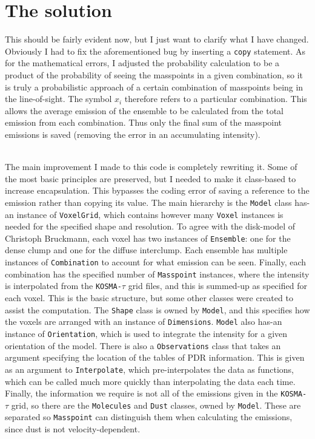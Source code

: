 \documentclass[onecolumn]{article}
\begin{document}
  \section{The solution}
  This should be fairly evident now, but I just want to clarify what I have changed. Obviously I had to fix the aforementioned bug by inserting a \texttt{copy} statement. As for the mathematical errors, I adjusted the probability calculation to be a product of the probability of seeing the masspoints in a given combination, so it is truly a probabilistic approach of a certain combination of masspoints being in the line-of-sight. The symbol $x_i$ therefore refers to a particular combination. This allows the average emission of the ensemble to be calculated from the total emission from each combination. Thus only the final sum of the masspoint emissions is saved (removing the error in an accumulating intensity).
  
  \hfill \\
  
  The main improvement I made to this code is completely rewriting it. Some of the most basic principles are preserved, but I needed to make it class-based to increase encapsulation. This bypasses the coding error of saving a reference to the emission rather than copying its value. The main hierarchy is the \texttt{Model} class has-an instance of \texttt{VoxelGrid}, which contains however many \texttt{Voxel} instances is needed for the specified shape and resolution. To agree with the disk-model of Christoph Bruckmann, each voxel has two instances of \texttt{Ensemble}: one for the dense clump and one for the diffuse interclump. Each ensemble has multiple instances of \texttt{Combination} to account for what emission can be seen. Finally, each combination has the specified number of \texttt{Masspoint} instances, where the intensity is interpolated from the \texttt{KOSMA-$\tau$} grid files, and this is summed-up as specified for each voxel. This is the basic structure, but some other classes were created to assist the computation. The \texttt{Shape} class is owned by \texttt{Model}, and this specifies how the voxels are arranged with an instance of \texttt{Dimensions}. \texttt{Model} also has-an instance of \texttt{Orientation}, which is used to integrate the intensity for a given orientation of the model. There is also a \texttt{Observations} class that takes an argument specifying the location of the tables of PDR information. This is given as an argument to \texttt{Interpolate}, which pre-interpolates the data as functions, which can be called much more quickly than interpolating the data each time. Finally, the information we require is not all of the emissions given in the \texttt{KOSMA-$\tau$} grid, so there are the \texttt{Molecules} and \texttt{Dust} classes, owned by \texttt{Model}. These are separated so \texttt{Masspoint} can distinguish them when calculating the emissions, since dust is not velocity-dependent.
\end{document}
